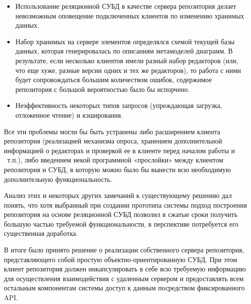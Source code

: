\documentclass[a4paper]{article}
\newcommand\liststyleWWviiiNumiv{%
\renewcommand\theenumi{\arabic{enumi}}
\renewcommand\theenumii{\arabic{enumii}}
\renewcommand\theenumiii{\arabic{enumiii}}
\renewcommand\labelitemi{[F0B7?]}
\renewcommand\labelenumi{\theenumi.}
\renewcommand\labelenumii{\theenumii.}
\renewcommand\labelenumiii{\theenumiii.}
}
\begin{document}
\liststyleWWviiiNumiv
\begin{itemize}
\item {
Использование реляционной СУБД в качестве сервера репозитория делает
невозможным оповещение подключенных клиентов по изменению хранимых
данных. }
\item {
Набор хранимых на сервере элементов определялся схемой текущей базы
данных, которая генерировалась по описаниям метамоделей диаграмм. В
результате, если несколько клиентов имели разный набор редакторов (или,
что еще хуже, разные версии одних и тех же редакторов), то работа с
ними будет сопровождаться большим количеством ошибок, содержимое
репозитория с большой вероятностью было бы испорчено. }
\item {
Неэффективность некоторых типов запросов (упреждающая загрузка,
отложенное чтение) и кэширования.}
\end{itemize}
{
Все эти проблемы могли бы быть устранены либо расширением клиента
репозитория (реализацией механизма опроса, хранением дополнительной
информацией о редакторах и проверкой ее в клиенте перед началом работы
и \ т.п.), либо введением некой программной «прослойки» между клиентом
репозитория и СУБД, в которую можно было бы вынести всю необходимую
дополнительную функциональность.}

{
Анализ этих и некоторых других замечаний к существующему решению дал
понять, что хотя выбранный при создании прототипа системы подход
построения репозитория на основе реляционной СУБД позволил в сжатые
сроки получить большую частью требуемой функциональности, в перспективе
потребуется его существенная доработка. }

{
В итоге было принято решение о реализации собственного сервера
репозитория, представляющего собой простую объектно-ориентированную
СУБД. При этом клиент репозитория должен инкапсулировать в себе всю
требуемую информацию для осуществления взаимодействия с удаленным
сервером и предоставлять всем остальным компонентам системы доступ к
данным посредством фиксированного \foreignlanguage{english}{API}. }
\end{document}
